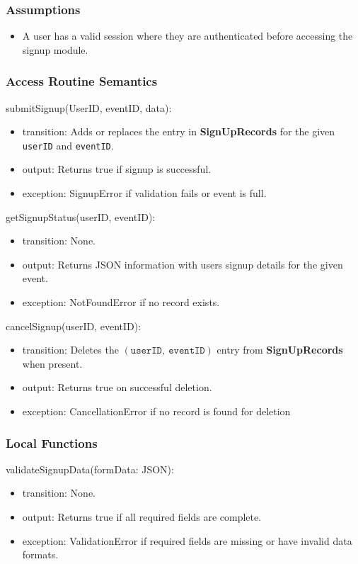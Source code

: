 \documentclass[12pt, titlepage]{article}
\begin{document}
\subsubsection{Assumptions}
\begin{itemize}
    \item A user has a valid session where they are authenticated before accessing the signup module.
\end{itemize}

\subsubsection{Access Routine Semantics}

\noindent submitSignup(UserID, eventID, data):
\begin{itemize}
\item transition: Adds or replaces the entry in \textbf{SignUpRecords} for the given \texttt{userID} and \texttt{eventID}.
\item output: Returns true if signup is successful.
\item exception: SignupError if validation fails or event is full.
\end{itemize}

\noindent getSignupStatus(userID, eventID):
\begin{itemize}
\item transition: None.
\item output: Returns JSON information with users signup details for the given event.
\item exception: NotFoundError if no record exists.
\end{itemize}

\noindent cancelSignup(userID, eventID):
\begin{itemize}
\item transition: Deletes the $(\texttt{userID},\ \texttt{eventID})$ entry from \textbf{SignUpRecords} when present.
\item output: Returns true on successful deletion.
\item exception: CancellationError if no record is found for deletion
\end{itemize}

\subsubsection{Local Functions}

\noindent validateSignupData(formData: JSON):
\begin{itemize}
\item transition: None.
\item output: Returns true if all required fields are complete.
\item exception: ValidationError if required fields are missing or have invalid data formats.
\end{itemize}
\end{document}
